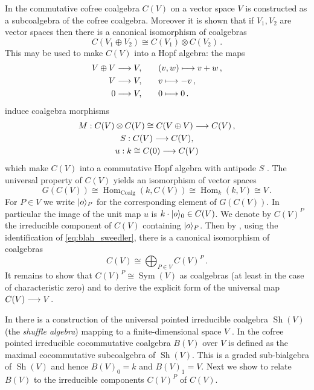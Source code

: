 \documentclass[english,letter paper,12pt,reqno]{article}
\DeclarePairedDelimiter\ket{\lvert}{\rangle}
\theoremstyle{example}
\numberwithin{equation}{section}
\def\sh{\operatorname{Sh}}
\def\Hom{\operatorname{Hom}}
\DeclareMathOperator{\Sym}{Sym}
\begin{document}
In \cite[Theorem 6.4.3]{sweedler} the commutative cofree coalgebra $C(V)$ on a vector space $V$ is constructed as a subcoalgebra of the cofree coalgebra. Moreover it is shown that if $V_1, V_2$ are vector spaces then there is a canonical isomorphism of coalgebras \cite[Theorem 6.4.4]{sweedler}
\[
C(V_1 \oplus V_2) \cong C(V_1) \otimes C(V_2)\,.
\]
This may be used to make $C(V)$ into a Hopf algebra: the maps
\begin{align*}
V \oplus V \longrightarrow V, &\qquad (v,w) \longmapsto v + w\,,\\
V \longrightarrow V, &\qquad v \longmapsto -v\,,\\
0 \longrightarrow V, &\qquad 0 \longmapsto 0\,.
\end{align*}
induce coalgebra morphisms
\begin{gather*}
M: C(V) \otimes C(V) \cong C(V \oplus V) \longrightarrow C(V)\,,\\
S: C(V) \longrightarrow C(V),\\
u: k \cong C(0) \longrightarrow C(V)
\end{gather*}
which make $C(V)$ into a commutative Hopf algebra with antipode $S$ \cite[Theorem 6.4.8]{sweedler}. The universal property of $C(V)$ yields an isomorphism of vector spaces
\begin{equation}\label{eq:blah_sweedler}
G(C(V)) \cong \Hom_{\operatorname{Coalg}}(k, C(V)) \cong \Hom_k(k, V) \cong V\,.
\end{equation}
For $P \in V$ we write $\ket{o}_P$ for the corresponding element of $G(C(V))$. In particular the image of the unit map $u$ is $k \cdot \ket{o}_0 \in C(V)$. We denote by $C(V)^P$ the irreducible component of $C(V)$ containing $\ket{o}_P$. Then by \cite[Proposition 8.1.2]{sweedler}, using the identification of \eqref{eq:blah_sweedler}, there is a canonical isomorphism of coalgebras
\[
C(V) \cong \bigoplus_{P \in V} C(V)^P\,.
\]
It remains to show that $C(V)^P \cong \Sym(V)$ as coalgebras (at least in the case of characteristic zero) and to derive the explicit form of the universal map $C(V) \longrightarrow V$.

In \cite[Chapter 12]{sweedler} there is a construction of the universal pointed irreducible coalgebra $\sh(V)$ (the \emph{shuffle algebra}) mapping to a finite-dimensional space $V$ \cite[Lemma 12.0.1]{sweedler}. In \cite[Section 12.2]{sweedler} the cofree pointed irreducible cocommutative coalgebra $B(V)$ over $V$ is defined as the maximal cocommutative subcoalgebra of $\sh(V)$. This is a graded sub-bialgebra of $\sh(V)$ and hence $B(V)_0 = k$ and $B(V)_1 = V$. Next we show to relate $B(V)$ to the irreducible components $C(V)^P$ of $C(V)$. 
\end{document}
